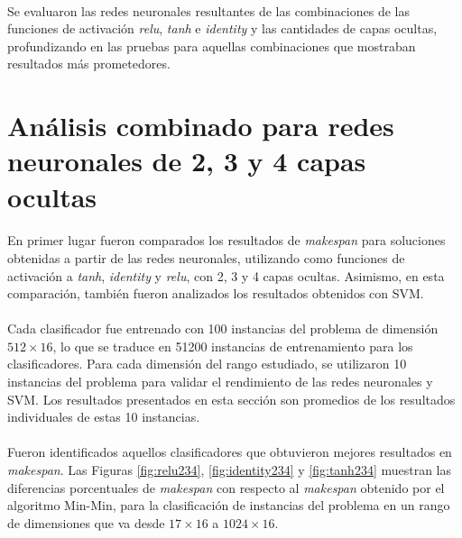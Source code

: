 \paragraph{} Se evaluaron las redes neuronales resultantes de las combinaciones de las funciones de activación \textit{relu}, \textit{tanh} e \textit{identity} y las cantidades de capas ocultas, profundizando en las pruebas para aquellas combinaciones que mostraban resultados más prometedores.

\section{Análisis combinado para redes neuronales de 2, 3 y 4 capas ocultas}

\paragraph{}En primer lugar fueron comparados los resultados de \textit{makespan} para soluciones obtenidas a partir de las redes neuronales, utilizando como funciones de activación a \textit{tanh}, \textit{identity} y \textit{relu}, con 2, 3 y 4 capas ocultas.
Asimismo, en esta comparación, también fueron analizados los resultados obtenidos con SVM. 

\paragraph{} Cada clasificador fue entrenado con 100 instancias del problema de dimensión $512\times16$, lo que se traduce en 51200 instancias de entrenamiento para los clasificadores. Para cada dimensión del rango estudiado, se utilizaron 10 instancias del problema para validar el rendimiento de las redes neuronales y SVM. Los resultados presentados en esta sección son promedios de los resultados individuales de estas 10 instancias.

\paragraph{} Fueron identificados aquellos clasificadores que obtuvieron mejores resultados en \textit{makespan}.
Las Figuras \ref{fig:relu234}, \ref{fig:identity234} y \ref{fig:tanh234} muestran las diferencias porcentuales de \textit{makespan} con respecto al \textit{makespan} obtenido por el algoritmo Min-Min, para la clasificación de instancias del problema en un rango de dimensiones que va desde $17\times16$ a $1024\times16$.


